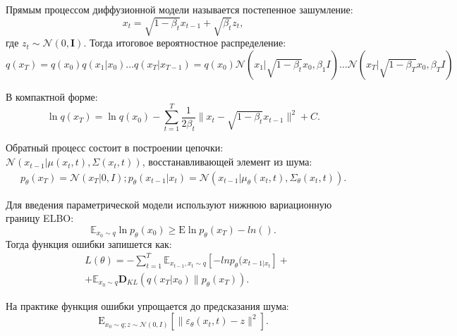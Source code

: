 Прямым процессом диффузионной модели называется постепенное зашумление:
\begin{equation}
    x_t = \sqrt{1-\beta_t} x_{t-1} + \sqrt{\beta_t} z_t,
\end{equation}
где $z_t \sim \mathcal{N}(0,\mathbf{I})$. 
Тогда итоговое вероятностное распределение:
\begin{equation}
    q(x_{T}) = q(x_0)q(x_1|x_0) \dots q(x_T|x_{T-1}) =
    q(x_0) \mathcal{N}(x_1|\sqrt{1-\beta_t}x_0,\beta_1I)\dots
    \mathcal{N}(x_T|\sqrt{1-\beta_T}x_0,\beta_TI)
\end{equation}

В компактной форме:
\begin{equation}
    \ln q(x_{T}) = \ln q(x_0) - \sum_{t=1}^T \frac{1}{2\beta_t} \| x_t - \sqrt{1-\beta_t} x_{t-1} \|^2 + C.
\end{equation}

Обратный процесс состоит в построении цепочки:
$\mathcal{N}(x_{t-1}|\mu(x_t,t),\Sigma(x_t,t))$, восстанавливающей элемент из шума:
\begin{equation}
    \begin{aligned}
        p_\theta(x_T) = \mathcal{N}(x_T|0,I);
        p_\theta(x_{t-1}|x_t) = \mathcal{N}(x_{t-1}|\mu_\theta(x_t,t), \Sigma_\theta(x_t,t)).
    \end{aligned}
\end{equation}

Для введения параметрической модели используют нижнюю вариационную границу ELBO:
\begin{equation}
    \mathbb{E}_{x_0 \sim q} \ln p_\theta(x_0) \ge \mathrm{E} \ln p_\theta(x_T) - ln().
\end{equation}
Тогда функция ошибки запишется как:
\begin{equation}
    \begin{aligned}
        &L(\theta) = - \sum_{t=1}^T\mathbb{E}_{x_{t-1},x_t \sim q} \left[-ln p_\theta(x_{t-1|x_t}\right] + \\
        &+ \mathbb{E}_{x_0 \sim q} \mathbf{D}_{KL}(q(x_T|x_0) \parallel p_\theta (x_T)).
    \end{aligned}
\end{equation}

На практике функция ошибки упрощается до предсказания шума:
\begin{equation}
    \mathrm{E}_{x_0 \sim q; z\sim \mathcal{N}(0,I)} 
    \left[ \| \varepsilon_\theta(x_t,t) -z \|^2\right].
\end{equation}


